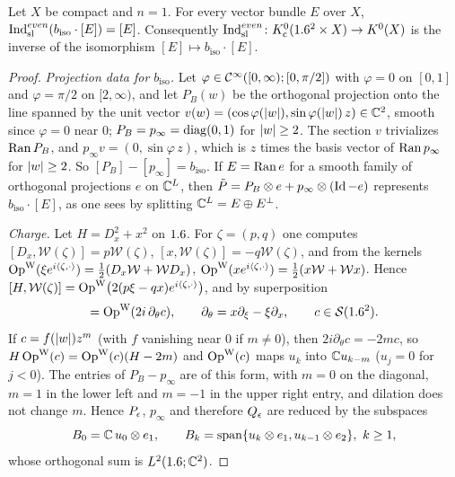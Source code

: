 \begin{proposition}\label{bott:prop:sl-bott-one}
  Let $X$ be compact and $n=1$. For every vector bundle $E$ over $X$,
  $\operatorname{Ind}^{even}_{\mathrm{sl}}(b_{\mathrm{iso}}\cdot[E])=[E]$. Consequently
  $\operatorname{Ind}^{even}_{\mathrm{sl}}\colon K_{\mathrm{c}}^0(1.6^2\times X)\to K^0(X)$ is the inverse of the isomorphism
  $[E]\mapsto b_{\mathrm{iso}}\cdot[E]$.
\end{proposition}
\begin{proof}
  \emph{Projection data for $b_{\mathrm{iso}}$.} Let $\varphi\in\mathcal{C}^\infty([0,\infty);[0,\pi/2])$
  with $\varphi=0$ on $[0,1]$ and $\varphi=\pi/2$ on $[2,\infty)$, and let $P_B(w)$ be the
  orthogonal projection onto the line spanned by the unit vector
  $v(w)=(\cos\varphi(\lvert w\rvert),\sin\varphi(\lvert w\rvert)\,z)\in\mathbb{C}^2$, smooth since $\varphi=0$ near
  $0$; $P_B=p_\infty=\operatorname{diag}(0,1)$ for $\lvert w\rvert\ge2$. The section $v$ trivializes $\operatorname{Ran} P_B$, and
  $p_\infty v=(0,\sin\varphi\,z)$, which is $z$ times the basis vector of $\operatorname{Ran} p_\infty$ for
  $\lvert w\rvert\ge2$. So $[P_B]-[p_\infty]=b_{\mathrm{iso}}$. If $E=\operatorname{Ran} e$ for a smooth family of
  orthogonal projections $e$ on $\mathbb{C}^L$, then $\tilde P=P_B\otimes e+p_\infty\otimes(\operatorname{Id}-e)$
  represents $b_{\mathrm{iso}}\cdot[E]$, as one sees by splitting $\mathbb{C}^L=E\oplus E^\perp$.

  \emph{Charge.} Let $H=D_x^2+x^2$ on $1.6$. For $\zeta=(p,q)$ one computes
  $[D_x,\mathcal W(\zeta)]=p\mathcal W(\zeta)$, $[x,\mathcal W(\zeta)]=-q\mathcal W(\zeta)$, and
  from the kernels $\operatorname{Op}^{\mathrm{W}}(\xi e^{i\langle \zeta, \cdot\rangle})=\frac12(D_x\mathcal W+\mathcal WD_x)$,
  $\operatorname{Op}^{\mathrm{W}}(xe^{i\langle \zeta, \cdot\rangle})=\frac12(x\mathcal W+\mathcal Wx)$. Hence
  $[H,\mathcal W(\zeta)]=\operatorname{Op}^{\mathrm{W}}\bigl(2(p\xi-qx)e^{i\langle \zeta, \cdot\rangle}\bigr)$, and by superposition
  \begin{equation*}
    [H,\OpW(c)]=\OpW(2i\,\partial_\theta c),\qquad\partial_\theta=x\partial_\xi-\xi\partial_x,\qquad
    c\in\cS(\R^2).
  \end{equation*}
  If $c=f(\lvert w\rvert)z^m$ (with $f$ vanishing near $0$ if $m\ne0$), then $2i\partial_\theta c=-2mc$, so
  $H\operatorname{Op}^{\mathrm{W}}(c)=\operatorname{Op}^{\mathrm{W}}(c)(H-2m)$ and $\operatorname{Op}^{\mathrm{W}}(c)$ maps $u_k$ into $\mathbb{C} u_{k-m}$ ($u_j=0$ for $j<0$). The
  entries of $P_B-p_\infty$ are of this form, with $m=0$ on the diagonal, $m=1$ in the
  lower left and $m=-1$ in the upper right entry, and dilation does not change $m$.
  Hence $P_\epsilon$, $p_\infty$ and therefore $Q_\epsilon$ are reduced by the subspaces
  \begin{equation*}
    B_0=\C\,u_0\otimes e_1,\qquad B_k=\operatorname{span}\{u_k\otimes e_1,u_{k-1}\otimes e_2\},\ k\ge1,
  \end{equation*}
  whose orthogonal sum is $L^2(1.6;\mathbb{C}^2)$.


\end{proof}
